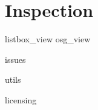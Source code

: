 \documentclass[10pt,letterpaper,extrafontsizes]{memoir}
\newcommand{\PWnote}[2]{}
\begin{document}




\section{Inspection}
\label{sec:inspection}

 {listbox_view}
 {osg_view}

 {issues}

 {utils}

 {licensing}






\end{document}
